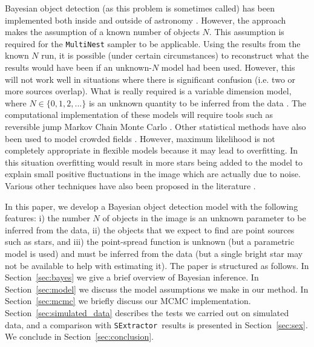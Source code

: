 \documentclass[12pt, preprint]{aastex}
\newcommand{\sex}{{\tt SExtractor}}
\begin{document}
Bayesian object detection (as this problem is sometimes called) has been
implemented both inside and outside of astronomy
\citep[e.g.][]{object, 2003MNRAS.338..765H, 2011MNRAS.415.3462F}. However, the
\citet{2011MNRAS.415.3462F} approach makes the assumption of a
known number of objects $N$.
This assumption is required for the
{\tt MultiNest} sampler \citep{multinest} to be applicable.
Using the results from the known $N$
run, it is possible (under certain circumstances) to reconstruct what the
results would have been if an unknown-$N$ model had been used. However,
this will not work well in situations where there is significant confusion
(i.e. two or more sources overlap). What is really required is a variable
dimension model, where $N \in \{0, 1, 2, ... \}$ is an unknown quantity to be
inferred from the data \citep[e.g.][]{2003MNRAS.338..765H}.
The computational implementation of these models will require tools such as
reversible jump Markov Chain Monte Carlo \citep{rjmcmc}. Other statistical
methods have also been used to model crowded fields
\citep[e.g. maximum likelihood,][]{irwin}.
However, maximum likelihood is not completely appropriate in flexible models
because it may lead to overfitting. In this situation overfitting would result
in more stars being added to the model to explain small positive fluctuations
in the image which are actually due to noise. Various other techniques have
also been proposed in the literature
\citep[e.g.][]{2002MNRAS.335...73M, 2007A&A...461..373M, 2009PASP..121.1429Z}.

In this paper, we develop a Bayesian object detection model with the following
features: i) the number $N$ of objects in the image is an unknown parameter
to be inferred from the data, ii) the objects that we expect to find are point sources such
as stars, and iii) the point-spread function is unknown (but a parametric model is
used) and must be inferred from
the data (but a single bright star may not be available to help with estimating it).
The paper is structured as follows. In Section~\ref{sec:bayes}
we give a brief overview of Bayesian inference. In Section~\ref{sec:model} we
discuss the model assumptions we make in our method. In Section~\ref{sec:mcmc}
we briefly discuss our
MCMC implementation. Section~\ref{sec:simulated_data} describes the tests we
carried out on simulated data, and a comparison with \sex~results is presented
in Section~\ref{sec:sex}. We conclude in Section~\ref{sec:conclusion}.
\end{document}
